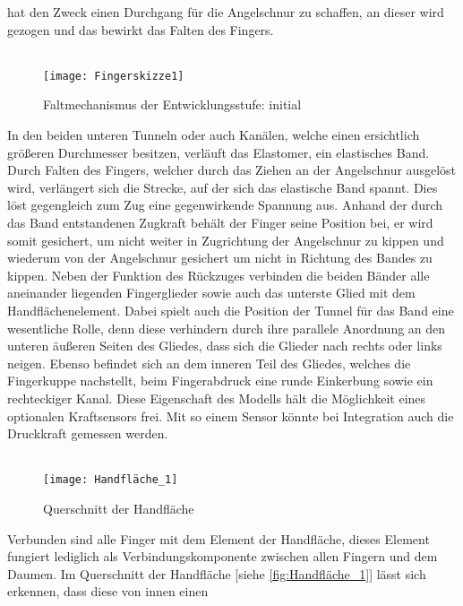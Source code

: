 \documentclass[titlepage,12pt,twoside]{article}
\begin{document}
hat den Zweck einen Durchgang für die Angelschnur zu schaffen, an dieser wird gezogen 
und das bewirkt das Falten des Fingers. \\
\\
\begin{figure}[H]
	\begin{center}
		\scalebox{1}
		{\texttt{[image: Fingerskizze1]}}
		\caption{Faltmechanismus der Entwicklungsstufe: initial}
		\label{fig:Fingerskizze1}		
	\end{center}
\end{figure}
\hfill \break
In den beiden unteren Tunneln oder auch Kanälen, 
welche einen ersichtlich größeren Durchmesser besitzen, verläuft das 
Elastomer, ein elastisches Band. Durch Falten des Fingers, welcher durch das Ziehen an der 
Angelschnur ausgelöst wird, verlängert sich die Strecke, auf der sich das elastische 
Band spannt. Dies löst gegengleich zum Zug eine gegenwirkende Spannung aus. 
Anhand der durch das Band entstandenen Zugkraft behält der Finger seine Position bei, 
er wird somit gesichert, um nicht weiter in Zugrichtung der Angelschnur zu kippen und 
wiederum von der Angelschnur gesichert um nicht in Richtung des Bandes zu kippen. Neben der 
Funktion des Rückzuges verbinden die beiden Bänder alle aneinander liegenden 
Fingerglieder sowie auch das unterste Glied mit dem Handflächenelement. Dabei 
spielt auch die Position der Tunnel für das Band eine wesentliche Rolle, denn 
diese verhindern durch ihre parallele Anordnung an den unteren äußeren Seiten 
des Gliedes, dass sich die Glieder nach rechts oder links neigen. 
Ebenso befindet sich an dem inneren Teil des Gliedes, welches die Fingerkuppe 
nachstellt, beim Fingerabdruck eine runde Einkerbung sowie ein rechteckiger Kanal. 
Diese Eigenschaft des Modells hält die Möglichkeit eines optionalen Kraftsensors frei. 
Mit so einem Sensor könnte bei Integration auch die Druckkraft 
gemessen werden. \\
\\
\begin{figure}[H]
	\begin{center}
		\scalebox{0.8}
		{\texttt{[image: Handfläche\_1]}}
		\caption{Querschnitt der Handfläche}
		\label{fig:Handfläche_1}		
	\end{center}
\end{figure}
\hfill \break
Verbunden sind alle Finger mit dem Element der Handfläche, dieses Element fungiert 
lediglich als Verbindungskomponente zwischen allen Fingern und dem Daumen. 
Im Querschnitt der Handfläche [siehe \textcolor{blue}{\autoref{fig:Handfläche_1}}] lässt sich erkennen, dass diese von innen einen 
\end{document}
